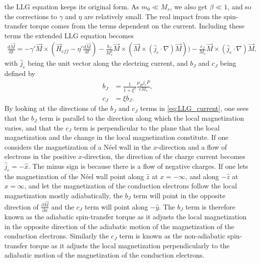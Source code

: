 \documentclass[12pt, a4paper]{article}		%
\numberwithin{equation}{section}
\begin{document}
the LLG equation keeps its original form. As $m_0\ll M_s$, we also get $\beta \ll 1$, and so the corrections to $\gamma$ and $\eta$ are relatively small. The real impact from the spin-transfer torque comes from the terms dependent on the current. Including these terms the extended LLG equation becomes
\begin{align}
\label{eq:LLG_current}
\frac{\textrm{d} \vec{M}}{\textrm{d} t} = -\gamma ' \vec{M} \times (\vec{H}_{eff} - \eta '\frac{\textrm{d} \vec{M}}{\textrm{d} t}) - \frac{b_J}{M_s^2} \vec{M}\times (\vec{M}\times(\hat{j}_e\cdot\nabla)\vec{M})) - \frac{c_J}{ M_s}\vec{M}\times(\hat{j}_e\cdot\nabla)\vec{M},
\end{align}
with $\hat{j}_e$ being the unit vector along the electring current, and $b_J$ and $c_J$ being defined by
\begin{align}
\label{eq:bJ} b_J &= \frac{1}{1+\xi^2} \frac{\mu_B j_e P}{e M_s}, \\
c_J &= \xi b_J.
\end{align}
By looking at the directions of the $b_J$ and $c_J$ terms in \eqref{eq:LLG_current}, one sees that the $b_J$ term is parallel to the direction along which the local magnetization varies, and that the $c_J$ term is perpendicular to the plane that the local magnetization and the change in the local magnetization constitute. If one considers the magnetization of a N\'{e}el wall in the $x$-direction and a flow of electrons in the positive $x$-direction, the direction of the charge current becomes $\hat{j}_e = -\hat{x}$. The minus sign is because there is a flow of negative charges. If one lets the magnetization of the N\'{e}el wall point along $\hat{z}$ at $x = -\infty$, and along $-\hat{z}$ at $x = \infty$, and let the magnetization of the conduction electrons follow the local magnetization mostly adiabatically, the $b_J$ term will point in the opposite direction of $\frac{\partial \vec{M}}{\partial x}$ and the $c_J$ term will point along $-\hat{y}$. The $b_J$ term is therefore known as the adiabatic spin-transfer torque as it adjusts the local magnetization in the opposite direction of the adiabatic motion of the magnetization of the conduction electrons. Similarly the $c_J$ term is known as the non-adiabatic spin-transfer torque as it adjusts the local magnetization perpendicularly to the adiabatic motion of the magnetization of the conduction electrons. 
\end{document}
